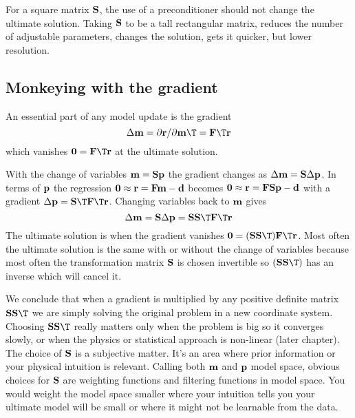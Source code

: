\par
For a square matrix $\bold S$,
the use of a preconditioner should not change the ultimate solution.
Taking $\bold S$ to be a tall rectangular matrix,
reduces the number of adjustable parameters,
changes the solution,
gets it quicker, but lower resolution.

\subsection{ Monkeying with the gradient }
An essential part of any model update is the gradient
\begin{equation}
\Delta \bold m = \partial \bold r / \partial \bold m\T = \bold F\T \bold r 
\end{equation}
which vanishes $\bold 0=\bold F\T \bold r$ at the ultimate solution.
\par
With the change of variables $\bold m = \bold S \bold p$ the gradient changes as
$\Delta \bold m = \bold S \Delta \bold p$.
In terms of $\bold p$ the regression
$\bold 0 \approx \bold r = \bold F \bold m - \bold d$
becomes
$\bold 0 \approx \bold r = \bold F \bold S \bold p - \bold d$
with a gradient
$\Delta \bold p = \bold S\T \bold F\T \bold r$.
Changing variables back to $\bold m$ gives
\begin{equation}
\Delta \bold m = \bold S \Delta \bold p = \bold S \bold S\T \bold F\T \bold r
\end{equation}
The ultimate solution is when the gradient vanishes $\bold 0 = (\bold S\bold S\T) \bold F\T \bold r$.
Most often the ultimate solution is the same with or without the change of variables
because most often the transformation matrix $\bold S$
is chosen invertible so $ (\bold S\bold S\T)$ has an inverse which will cancel it.
\par
We conclude that when a gradient is multiplied by any
positive definite matrix $\bold S\bold S\T$
we are simply solving the original problem in a new coordinate system.
Choosing $\bold S\bold S\T$
really matters only when the problem is big so it converges slowly,
or when the physics or statistical approach is non-linear (later chapter).
The choice of $\bold S$ is a subjective matter.
It's an area where prior information or your physical intuition is relevant.
Calling both $\bold m$ and $\bold p$ model space,
obvious choices for $\bold S$ are weighting functions
and filtering functions in model space.
You would weight the model space smaller where your intuition
tells you your ultimate model will be small or where it might not be
learnable from the data.


